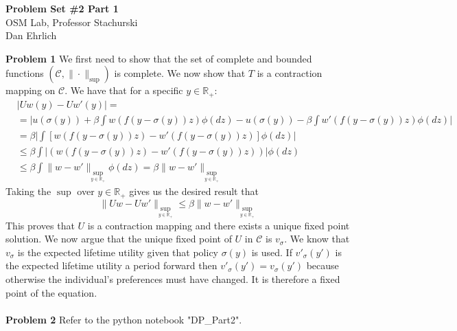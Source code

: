 \documentclass[letterpaper,12pt]{article}
\theoremstyle{definition}
\newcommand{\R}{\mathbb{R}}
\begin{document}
\begin{flushleft}
  \textbf{\large{Problem Set \#2 Part 1}} \\
  OSM Lab, Professor Stachurski  \\
  Dan Ehrlich
\end{flushleft}

\vspace{3mm}

\noindent\textbf{Problem 1}
We first need to show that the set of complete and bounded functions $(\mathscr{C}, \|\cdot\|_{\sup}) $ is complete. We now show that $T$ is a contraction mapping on $\mathscr{C}$. We have that for a specific $y \in \R_+$: 
\begin{equation*}
\begin{aligned}
& \big | Uw(y) - Uw'(y) \big |=  \\
&= \big| u(\sigma(y))+ \beta \int w(f(y - \sigma(y))z) \phi(dz)- u(\sigma(y))- \beta \int w'(f(y - \sigma(y))z) \phi(dz) \big| \\
&= \beta \big| \int [w(f(y - \sigma(y))z) -  w'(f(y - \sigma(y))z)] \phi(dz) \big|  \\
& \leq \beta \int \big | (w(f(y - \sigma(y))z) - w'(f(y - \sigma(y))z))\big |  \phi(dz)  \\
& \leq \beta \int \|w-w'\|_{\sup_{y \in \R_+} } \phi(dz) = \beta \|w-w'\|_{\sup_{y \in \R_+} }
\end{aligned}
\end{equation*}
Taking the $\sup$ over $y \in \R_+$ gives us the desired result that $$\|Uw - Uw'\|_{\sup_{y \in \R_+} } \leq \beta \|w-w'\|_{\sup_{y \in \R_+} }$$ 
This proves that $U$ is a contraction mapping and there exists a unique fixed point solution. We now argue that the unique fixed point of $U$ in $\mathscr{C}$ is $v_{\sigma}$. We know that $v_{\sigma}$ is the expected  lifetime utility given that policy $\sigma(y)$ is used. If  $v'_{\sigma}(y')$ is the expected lifetime utility a period forward then  $v'_{\sigma}(y') = v_{\sigma}(y')$ because otherwise the individual's preferences must have changed. It is therefore a fixed point of the equation. \\\\
\noindent\textbf{Problem 2} Refer to the python notebook "DP\_Part2". 
\end{document}
